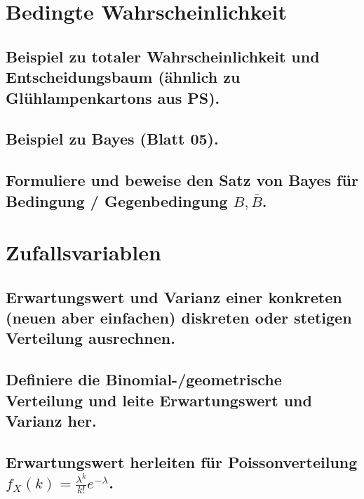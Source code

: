 \documentclass[a4paper,10pt]{article}
\begin{document}
\subsection{}

\newpage
\section{Bedingte Wahrscheinlichkeit}
\subsection{Bei\-spiel zu totaler Wahrschein\-lich\-keit und Entscheidungs\-baum (ähnlich zu Glüh\-lampen\-kartons aus PS).}

\subsection{Beispiel zu Bayes (Blatt 05).}

\subsection{Formuliere und beweise den Satz von Bayes für Bedingung / Gegenbedingung $B, \bar{B}$.}

\newpage
\section{Zufallsvariablen}
\subsection{Erwartungswert und Varianz einer konkreten (neuen aber einfachen) diskreten oder stetigen Verteilung ausrechnen.}

\subsection{Definiere die Binomial-/geometrische Verteilung und leite Erwartungswert und Varianz her.}

\subsection{Erwartungswert herleiten für Poisson\-verteilung $f_X (k)=\frac{\lambda^k}{k!}e^{-\lambda}$.}
\end{document}
